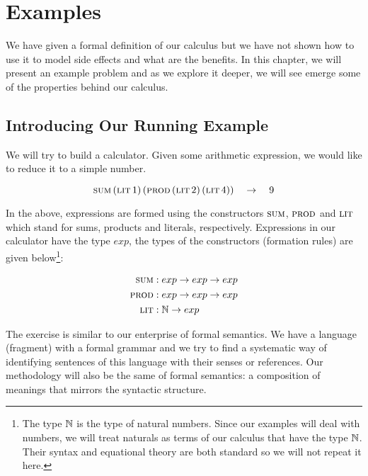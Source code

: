 \chapter{Examples}
\label{chap:examples}

\NoChapterPrefix

We have given a formal definition of our calculus but we have not shown how
to use it to model side effects and what are the benefits. In this chapter,
we will present an example problem and as we explore it deeper, we will see
emerge some of the properties behind our calculus.

\minitoc

\section{Introducing Our Running Example}

We will try to build a calculator. Given some arithmetic expression, we
would like to reduce it to a simple number. 

$$
\textsc{sum}\,(\textsc{lit}\,1)\,(\textsc{prod}\,(\textsc{lit}\,2)\,(\textsc{lit}\,4))
\quad \to \quad 9
$$

In the above, expressions are formed using the constructors $\textsc{sum}$,
$\textsc{prod}$ and $\textsc{lit}$ which stand for sums, products and literals,
respectively. Expressions in our calculator have the type $exp$, the types
of the constructors (formation rules) are given below\footnote{The type
  $\mathbb{N}$ is the type of natural numbers. Since our examples will deal with
  numbers, we will treat naturals as terms of our calculus that have the
  type $\mathbb{N}$. Their syntax and equational theory are both standard so we
  will not repeat it here.}:

\begin{align*}
  \textsc{sum} &: exp \to exp \to exp \\
  \textsc{prod} &: exp \to exp \to exp \\
  \textsc{lit} &: \mathbb{N} \to exp
\end{align*}

The exercise is similar to our enterprise of formal semantics. We have a
language (fragment) with a formal grammar and we try to find a systematic
way of identifying sentences of this language with their senses or
references. Our methodology will also be the same of formal semantics: a
composition of meanings that mirrors the syntactic structure.

